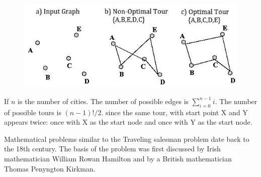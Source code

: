 \documentclass[10pt,twocolumn,letterpaper]{article}
\begin{document}
\begin{figure}
\centering
\includegraphics[width=.7\linewidth]{egtsp}
\caption{}
\label{fig:egtsp}
\end{figure}
If $n$ is the number of cities. The number of possible edges is $\sum_{i=0}^{n-1}i$. The number of possible tours is $(n - 1)!/2$. since the same tour, with start point
X and Y appears twice: once with X as the start node and
once with Y as the start node.

Mathematical problems similar to the Traveling salesman
problem date back to the 18th century. The basis of the
problem was first discussed by Irish mathematician William
Rowan Hamilton and by a British mathematician Thomas
Penyngton Kirkman.
\end{document}
